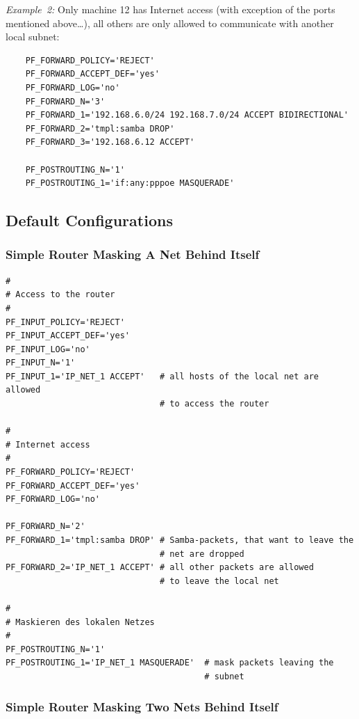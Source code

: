 \emph{Example~2:} Only machine 12 has Internet access (with exception of the
ports mentioned above\ldots), all others are only allowed to communicate with
another local subnet:

\begin{example}
\begin{verbatim}
    PF_FORWARD_POLICY='REJECT'
    PF_FORWARD_ACCEPT_DEF='yes'
    PF_FORWARD_LOG='no'
    PF_FORWARD_N='3'
    PF_FORWARD_1='192.168.6.0/24 192.168.7.0/24 ACCEPT BIDIRECTIONAL'
    PF_FORWARD_2='tmpl:samba DROP'
    PF_FORWARD_3='192.168.6.12 ACCEPT'

    PF_POSTROUTING_N='1'
    PF_POSTROUTING_1='if:any:pppoe MASQUERADE'
\end{verbatim}
\end{example}

\subsection{Default Configurations}

\subsubsection{Simple Router Masking A Net Behind Itself}

\begin{example}
\begin{verbatim}
#
# Access to the router
#
PF_INPUT_POLICY='REJECT'
PF_INPUT_ACCEPT_DEF='yes'
PF_INPUT_LOG='no'
PF_INPUT_N='1'
PF_INPUT_1='IP_NET_1 ACCEPT'   # all hosts of the local net are allowed
                               # to access the router

#
# Internet access
#
PF_FORWARD_POLICY='REJECT'
PF_FORWARD_ACCEPT_DEF='yes'
PF_FORWARD_LOG='no'

PF_FORWARD_N='2'
PF_FORWARD_1='tmpl:samba DROP' # Samba-packets, that want to leave the
                               # net are dropped
PF_FORWARD_2='IP_NET_1 ACCEPT' # all other packets are allowed
                               # to leave the local net

#
# Maskieren des lokalen Netzes
#
PF_POSTROUTING_N='1'
PF_POSTROUTING_1='IP_NET_1 MASQUERADE'  # mask packets leaving the
                                        # subnet
\end{verbatim}
\end{example}

\subsubsection{Simple Router Masking Two Nets Behind Itself}

